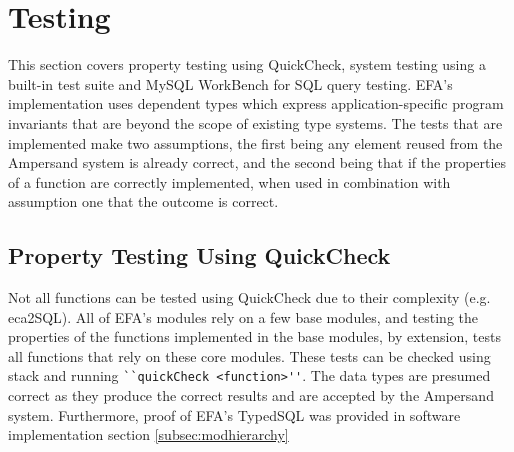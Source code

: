 \chapter{Testing}

This section covers property testing using QuickCheck, system testing using a 
built-in test suite and MySQL WorkBench for SQL query testing. EFA's 
implementation uses dependent types which express application-specific program 
invariants that are beyond the scope of existing type systems. The tests that 
are implemented make two assumptions, the first being any element reused from 
the Ampersand system is already correct, and the second being that if the 
properties of a function are correctly implemented, when used in combination 
with assumption one that the outcome is correct.

\section{Property Testing Using QuickCheck}
Not all functions can be tested using QuickCheck due to their complexity (e.g. 
eca2SQL). All of EFA's modules rely on a few base modules, and testing the 
properties of the functions implemented in the base modules, by extension, 
tests all functions that rely on these core modules. These tests can be checked 
using stack and running \verb|``quickCheck <function>''|. The data types are 
presumed correct as they produce the correct results and are accepted by the 
Ampersand system. Furthermore, proof of EFA's TypedSQL was provided in software 
implementation section \ref{subsec:modhierarchy}
